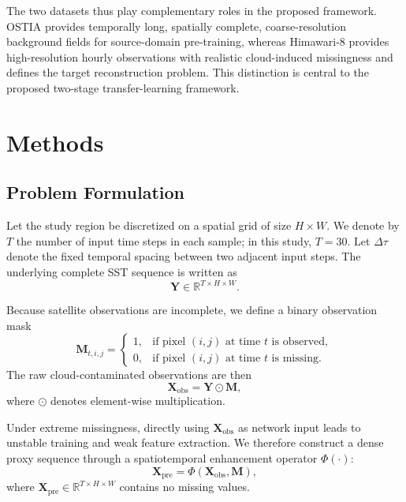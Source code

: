 \documentclass[12pt,reqno]{amsart}
\begin{document}
The two datasets thus play complementary roles in the proposed framework. OSTIA provides temporally long, spatially complete, coarse-resolution background fields for source-domain pre-training, whereas Himawari-8 provides high-resolution hourly observations with realistic cloud-induced missingness and defines the target reconstruction problem. This distinction is central to the proposed two-stage transfer-learning framework.








\section{Methods}

\subsection{Problem Formulation}

Let the study region be discretized on a spatial grid of size $H \times W$. We denote by $T$ the number of input time steps in each sample; in this study, $T=30$. Let $\Delta\tau$ denote the fixed temporal spacing between two adjacent input steps. The underlying complete SST sequence is written as
\begin{equation}
\mathbf{Y} \in \mathbb{R}^{T\times H\times W}.
\end{equation}

Because satellite observations are incomplete, we define a binary observation mask
\begin{equation}
\mathbf{M}_{t,i,j}=
\begin{cases}
1, & \text{if pixel }(i,j)\text{ at time }t\text{ is observed},\\
0, & \text{if pixel }(i,j)\text{ at time }t\text{ is missing}.
\end{cases}
\end{equation}
The raw cloud-contaminated observations are then
\begin{equation}
\mathbf{X}_{\mathrm{obs}} = \mathbf{Y}\odot\mathbf{M},
\end{equation}
where $\odot$ denotes element-wise multiplication.

Under extreme missingness, directly using $\mathbf{X}_{\mathrm{obs}}$ as network input leads to unstable training and weak feature extraction. We therefore construct a dense proxy sequence through a spatiotemporal enhancement operator $\Phi(\cdot)$:
\begin{equation}
\mathbf{X}_{\mathrm{pre}} = \Phi(\mathbf{X}_{\mathrm{obs}},\mathbf{M}),
\end{equation}
where $\mathbf{X}_{\mathrm{pre}}\in\mathbb{R}^{T\times H\times W}$ contains no missing values.
\end{document}

